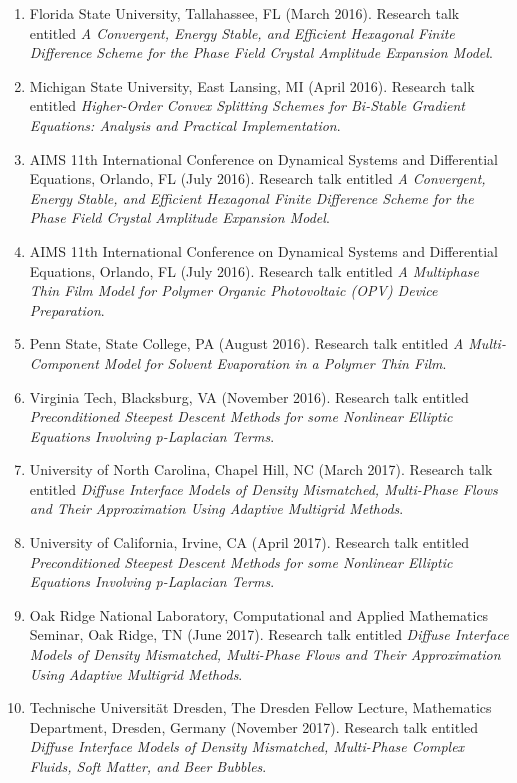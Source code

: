 \documentclass[10pt,letterpaper]{article}
\begin{document}
\begin{enumerate}
	\item
Florida State University, Tallahassee, FL (March 2016). Research talk entitled {\sl A Convergent, Energy Stable, and Efficient Hexagonal Finite Difference Scheme for the Phase Field Crystal Amplitude Expansion Model}.
	\item
Michigan State University, East Lansing, MI (April 2016). Research talk entitled {\sl Higher-Order Convex Splitting Schemes for Bi-Stable Gradient Equations: Analysis and Practical Implementation}.
	\item
AIMS 11th International Conference on Dynamical Systems and Differential Equations, Orlando, FL (July 2016). Research talk entitled {\sl A Convergent, Energy Stable, and Efficient Hexagonal Finite Difference Scheme for the Phase Field Crystal Amplitude Expansion Model}.
	\item
AIMS 11th International Conference on Dynamical Systems and Differential Equations, Orlando, FL (July 2016). Research talk entitled {\sl A Multiphase Thin Film Model for Polymer Organic Photovoltaic (OPV) Device Preparation}.
	\item
Penn State, State College, PA (August 2016).  Research talk entitled {\sl A Multi-Component Model for Solvent Evaporation in a Polymer Thin Film}.
	\item
Virginia Tech, Blacksburg, VA (November 2016).  Research talk entitled {\sl Preconditioned Steepest Descent Methods for some Nonlinear Elliptic Equations Involving p-Laplacian Terms}.
	\item
University of North Carolina, Chapel Hill, NC (March 2017).  Research talk entitled {\sl Diffuse Interface Models of Density Mismatched, Multi-Phase Flows and Their Approximation Using Adaptive Multigrid Methods}.
	\item
University of California, Irvine, CA (April 2017).  Research talk entitled {\sl Preconditioned Steepest Descent Methods for some Nonlinear Elliptic Equations Involving p-Laplacian Terms}.
	\item
Oak Ridge National Laboratory, Computational and Applied Mathematics Seminar, Oak Ridge, TN (June 2017).  Research talk entitled {\sl Diffuse Interface Models of Density Mismatched, Multi-Phase Flows and Their Approximation Using Adaptive Multigrid Methods}.
	\item
Technische Universit\"{a}t Dresden, The Dresden Fellow Lecture, Mathematics Department, Dresden, Germany (November 2017).  Research talk entitled {\sl Diffuse Interface Models of Density Mismatched, Multi-Phase Complex Fluids, Soft Matter, and Beer Bubbles}.

\end{enumerate}
\end{document}
